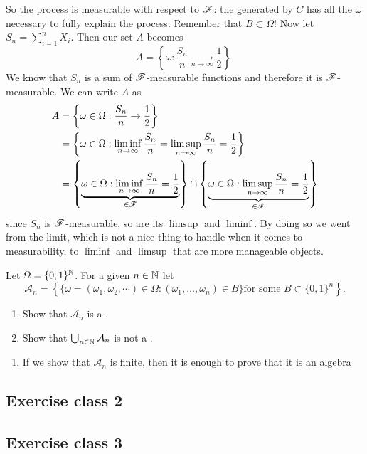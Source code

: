 \documentclass{report}
\begin{document}
So the process is measurable with respect to $\mathscr{F}$: the \sa{} generated by $C$ has all the $\omega$ necessary to fully explain the process. Remember that $B\subset\Omega$! Now let $S_n=\sum_{i=1}^{n}X_i$. Then our set $A$ becomes
\begin{equation*}
	A=\left\{\omega:\frac{S_n}{n}\xrightarrow[n\to\infty]{}\frac{1}{2}\right\}.
\end{equation*}We know that $S_n$ is a sum of $\mathscr{F}$-measurable functions and therefore it is $\mathscr{F}$-measurable. We can write $A$ as
\begin{align*}
	A&=\left\{\omega\in\Omega:\frac{S_n}{n}\to\frac{1}{2}\right\}\\
	&=\left\{\omega\in\Omega:\liminf_{n \to \infty}\frac{S_n}{n}=\limsup_{n\to\infty}\frac{S_n}{n}=\frac{1}{2}\right\}\\
	&=\left\{\underbrace{\omega\in\Omega:\liminf_{n \to \infty}\frac{S_n}{n}=\frac{1}{2}}_{\in\mathscr{F}}\right\}\cap\left\{\underbrace{\omega\in\Omega:\limsup_{n \to \infty}\frac{S_n}{n}=\frac{1}{2}}_{\in\mathscr{F}}\right\}
\end{align*}
since $S_n$ is $\mathscr{F}$-measurable, so are its $\limsup$ and $\liminf$. By doing so we went from the limit, which is not a nice thing to handle when it comes to measurability, to $\liminf$ and $\limsup$ that are more manageable objects.
\begin{exercise}
	Let $\Omega=\{0,1\}^{\mathbb{N}}$. For a given $n\in\mathbb{N}$ let 
	\begin{equation*}
		\mathcal{A}_n=\left\{\{\omega=(\omega_1,\omega_2,\cdots)\in\Omega:(\omega_1,\ldots,\omega_n)\in B\}\text{for some }B\subset\{0,1\}^{n}\right\}.
	\end{equation*}
	\begin{enumerate}[\circnum]
		\item Show that $\mathcal{A}_n$ is a \sa.
		\item Show that $\bigcup_{n\in\mathbb{N}}\mathcal{A}_{n}$ is not a \sa.
	\end{enumerate}
\end{exercise}
\begin{enumerate}[\circnum]
	\item If we show that $\mathcal{A}_n$ is finite, then it is enough to prove that it is an algebra
\end{enumerate}
\subsection{Exercise class 2}
\subsection{Exercise class 3}
\end{document}
